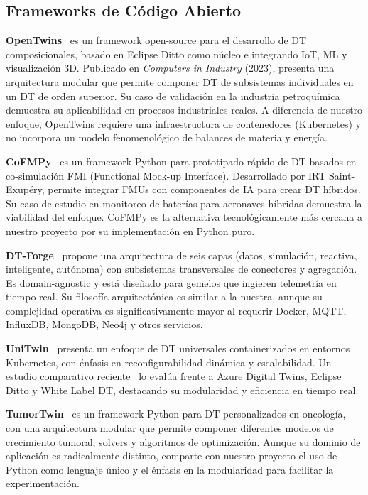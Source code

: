 \documentclass[10pt,letterpaper,twocolumn]{article}
\begin{document}
\subsection{Frameworks de Código Abierto}

\textbf{OpenTwins}~\cite{robles2023opentwins} es un framework open-source para el desarrollo de DT composicionales, basado en Eclipse Ditto como núcleo e integrando IoT, ML y visualización 3D. Publicado en \textit{Computers in Industry} (2023), presenta una arquitectura modular que permite componer DT de subsistemas individuales en un DT de orden superior. Su caso de validación en la industria petroquímica demuestra su aplicabilidad en procesos industriales reales. A diferencia de nuestro enfoque, OpenTwins requiere una infraestructura de contenedores (Kubernetes) y no incorpora un modelo fenomenológico de balances de materia y energía.

\textbf{CoFMPy}~\cite{friedrich2025cofmupy} es un framework Python para prototipado rápido de DT basados en co-simulación FMI (Functional Mock-up Interface). Desarrollado por IRT Saint-Exupéry, permite integrar FMUs con componentes de IA para crear DT híbridos. Su caso de estudio en monitoreo de baterías para aeronaves híbridas demuestra la viabilidad del enfoque. CoFMPy es la alternativa tecnológicamente más cercana a nuestro proyecto por su implementación en Python puro.

\textbf{DT-Forge}~\cite{dtforge2025} propone una arquitectura de seis capas (datos, simulación, reactiva, inteligente, autónoma) con subsistemas transversales de conectores y agregación. Es domain-agnostic y está diseñado para gemelos que ingieren telemetría en tiempo real. Su filosofía arquitectónica es similar a la nuestra, aunque su complejidad operativa es significativamente mayor al requerir Docker, MQTT, InfluxDB, MongoDB, Neo4j y otros servicios.

\textbf{UniTwin}~\cite{haussermann2024unitwin} presenta un enfoque de DT universales containerizados en entornos Kubernetes, con énfasis en reconfigurabilidad dinámica y escalabilidad. Un estudio comparativo reciente~\cite{haussermann2025comparative} lo evalúa frente a Azure Digital Twins, Eclipse Ditto y White Label DT, destacando su modularidad y eficiencia en tiempo real.

\textbf{TumorTwin}~\cite{tumortwin2025} es un framework Python para DT personalizados en oncología, con una arquitectura modular que permite componer diferentes modelos de crecimiento tumoral, solvers y algoritmos de optimización. Aunque su dominio de aplicación es radicalmente distinto, comparte con nuestro proyecto el uso de Python como lenguaje único y el énfasis en la modularidad para facilitar la experimentación.
\end{document}
